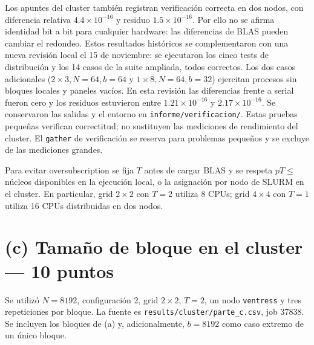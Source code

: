 \documentclass[
  spanish,
  11pt,
  a4paper,
]{article}
\begin{document}
Los apuntes del cluster también registran verificación correcta en dos
nodos, con diferencia relativa \(4.4\times10^{-16}\) y residuo
\(1.5\times10^{-16}\). Por ello no se afirma identidad bit a bit para
cualquier hardware: las diferencias de BLAS pueden cambiar el redondeo.
Estos resultados históricos se complementaron con una nueva revisión
local el 15 de noviembre: se ejecutaron los cinco tests de distribución
y los 14 casos de la suite ampliada, todos correctos. Los dos casos
adicionales (\(2\times3,N=64,b=64\) y \(1\times8,N=64,b=32\)) ejercitan
procesos sin bloques locales y paneles vacíos. En esta revisión las
diferencias frente a serial fueron cero y los residuos estuvieron entre
\(1.21\times10^{-16}\) y \(2.17\times10^{-16}\). Se conservaron las
salidas y el entorno en \texttt{informe/verificacion/}. Estas pruebas
pequeñas verifican correctitud; no sustituyen las mediciones de
rendimiento del cluster. El \texttt{gather} de verificación se reserva
para problemas pequeños y se excluye de las mediciones grandes.

Para evitar oversubscription se fija \(T\) antes de cargar BLAS y se
respeta \(pT\leq\) núcleos disponibles en la ejecución local, o la
asignación por nodo de SLURM en el cluster. En particular, grid
\(2\times2\) con \(T=2\) utiliza 8 CPUs; grid \(4\times4\) con \(T=1\)
utiliza 16 CPUs distribuidas en dos nodos.

\clearpage

\section{(c) Tamaño de bloque en el cluster --- 10
puntos}\label{c-tamauxf1o-de-bloque-en-el-cluster-10-puntos}

Se utilizó \(N=8192\), configuración 2, grid \(2\times2\), \(T=2\), un
nodo \texttt{ventress} y tres repeticiones por bloque. La fuente es
\texttt{results/cluster/parte\_c.csv}, job 37838. Se incluyen los
bloques de (a) y, adicionalmente, \(b=8192\) como caso extremo de un
único bloque.
\end{document}
